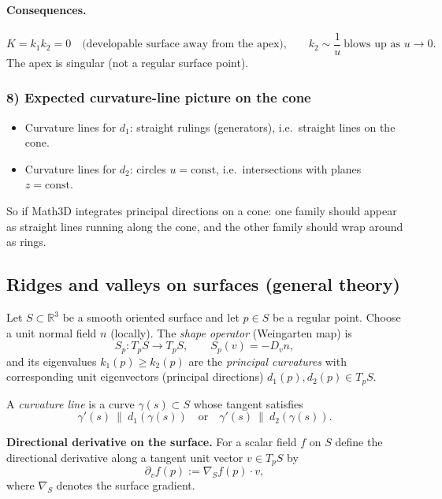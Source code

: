 \documentclass[12pt,a4paper]{article}
\theoremstyle{plain}
\theoremstyle{definition}      %
\begin{document}
\paragraph{Consequences.}
\[
K=k_1k_2=0
\quad\text{(developable surface away from the apex),}
\qquad
k_2\sim \frac{1}{u}\ \text{blows up as }u\to 0.
\]
The apex is singular (not a regular surface point).

\subsubsection*{8) Expected curvature-line picture on the cone}

\begin{itemize}
	\item Curvature lines for $d_1$: straight rulings (generators), i.e.\ straight lines on the cone.
	\item Curvature lines for $d_2$: circles $u=\mathrm{const}$, i.e.\ intersections with planes $z=\mathrm{const}$.
\end{itemize}

\noindent
So if Math3D integrates principal directions on a cone:
one family should appear as straight lines running along the cone,
and the other family should wrap around as rings.



\subsection*{Ridges and valleys on surfaces (general theory)}

Let $S\subset\mathbb{R}^3$ be a smooth oriented surface and let $p\in S$ be a regular point.
Choose a unit normal field $n$ (locally). The \emph{shape operator} (Weingarten map) is
\[
S_p:T_pS\to T_pS,\qquad S_p(v)=-D_v n,
\]
and its eigenvalues $k_1(p)\ge k_2(p)$ are the \emph{principal curvatures} with corresponding
unit eigenvectors (principal directions) $d_1(p),d_2(p)\in T_pS$.

A \emph{curvature line} is a curve $\gamma(s)\subset S$ whose tangent satisfies
\[
\gamma'(s)\ \parallel\ d_1(\gamma(s))
\quad\text{or}\quad
\gamma'(s)\ \parallel\ d_2(\gamma(s)).
\]

\medskip
\noindent
\textbf{Directional derivative on the surface.}
For a scalar field $f$ on $S$ define the directional derivative along a tangent unit vector $v\in T_pS$ by
\[
\partial_v f(p) := \nabla_S f(p)\cdot v,
\]
where $\nabla_S$ denotes the surface gradient.
\end{document}
